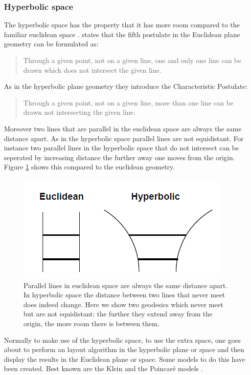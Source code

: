 \documentclass[a4paper,11pt]{kth-mag}
\begin{document}
\subsubsection{Hyperbolic space}
The hyperbolic space has the property that it has more room compared to the familiar euclidean space \cite{636718}. \cite{Wolfe} states that the fifth postulate in the Euclidean plane geometry can be formulated as: 
\begin{quote}
Through a given point, not on a given line, one and only one line can be drawn which does not intersect the given line.
\end{quote}
 As in the hyperbolic plane geometry they introduce the Characteristic Postulate:
\begin{quote}
Through a given point, not on a given line, more than one line can be drawn not intersecting the given line.
\end{quote}
Moreover two lines that are parallel in the euclidean space are always the same distance apart. As in the hyperbolic space parallel lines are not equidistant. For instance two parallel lines in the hyperbolic space that do 
not intersect can be seperated by increasing distance the further away one moves from the origin. Figure \ref{fig:hyperbolic_comp} shows this compared to the euclidean geometry.

\begin{figure}[!htbp]
	\centering
	\includegraphics{HyperBolicGeom}
	\caption{Parallel lines in euclidean space are always the same
distance apart. In hyperbolic space the distance between
two lines that never meet does indeed change. Here we show two
geodesics which never meet but are not equidistant: the further they
extend away from the origin, the more room there is between them.}
	\label{fig:hyperbolic_comp}
\end{figure}

Normally to make use of the hyperbolic space, to use the extra space, one goes about to perform an layout algorithm in the hyperbolic plane or space and then display the results in the Euclidean plane or space. Some models
to do this have been created. Best known are the Klein and the Poincar\'e  models \cite{herman00}.
\end{document}
